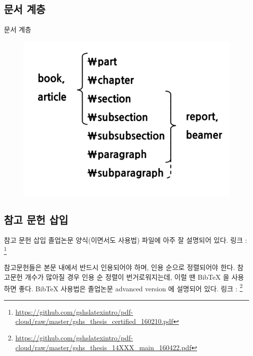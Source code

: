 \documentclass[12pt]{beamer}
\begin{document}
\subsection{문서 계층}
\begin{frame}{문서 계층}
	\begin{figure}
		\centering
		\includegraphics[width=\textwidth]{hier.pdf}
	\end{figure}
\end{frame}
\subsection{참고 문헌 삽입}
\begin{frame}{참고 문헌 삽입}
	졸업논문 양식(이면서도 사용법) 파일에 아주 잘 설명되어 있다. 링크 : \footnote{\url{https://github.com/gshslatexintro/pdf-cloud/raw/master/gshs_thesis_certified_160210.pdf}}
	\vspace{1cm}
	
	참고문헌들은 본문 내에서 반드시 인용되어야 하며, 인용 순으로 정렬되어야 한다. 참고문헌 개수가 많아질 경우 인용 순 정렬이 번거로워지는데, 이럴 땐 BibTeX 을 사용하면 좋다. BibTeX 사용법은 졸업논문 advanced version 에 설명되어 있다. 링크 : \footnote{\url{https://github.com/gshslatexintro/pdf-cloud/raw/master/gshs_thesis_14XXX_main_160422.pdf}}
\end{frame}
\end{document}
